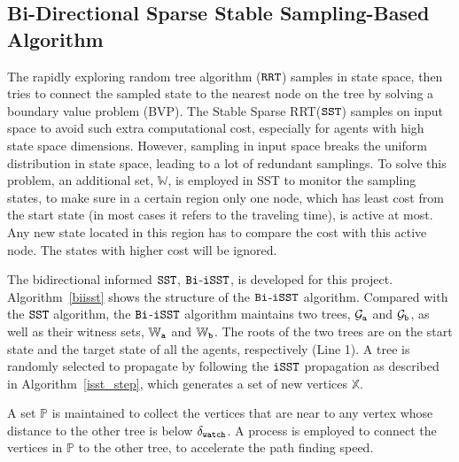\documentclass[conference, onecolumn]{IEEEtran}
\begin{document}
\subsection{Bi-Directional Sparse Stable Sampling-Based Algorithm}
The rapidly exploring random tree algorithm ($\tt RRT$)\cite{lavalle1998rapidly} samples in state space, then tries to connect the sampled state to the nearest node on the tree by solving a boundary value problem (BVP). The Stable Sparse RRT($\tt SST$)\cite{sst} samples on input space to avoid such extra computational cost, especially for agents with high state space dimensions. However, sampling in input space breaks the uniform distribution in state space, leading to a lot of redundant samplings. To solve this problem, an additional set, $\mathbb{W}$, is employed in SST to monitor the sampling states, to make sure in a certain region only one node, which has least cost from the start state (in most cases it refers to the traveling time), is active at most. Any new state located in this region has to compare the cost with this active node. The states with higher cost will be ignored. 

The bidirectional informed $\tt SST$, ${{\tt Bi}}$-${{\tt iSST}}$, is developed for this project. Algorithm~\ref{biisst} shows the structure of the ${{\tt Bi}}$-${{\tt iSST}}$ algorithm. Compared with the ${{\tt SST}}$ algorithm, the ${{\tt Bi}}$-${{\tt iSST}}$ algorithm maintains two trees, $\mathcal{G}_{\tt a} $ and $ \mathcal{G}_{\tt b} $, as well as their witness sets, $\mathbb{W}_{\tt a} $ and $ \mathbb{W}_{\tt b} $. The roots of the two trees are on the start state and the target state of all the agents, respectively (Line 1). A tree is randomly selected to propagate by following the $\tt iSST$ propagation as described in Algorithm~\ref{isst_step}, which generates a set of new vertices $\mathbb{X}$.

A set $\mathbb{P}$ is maintained to collect the vertices that are near to any vertex whose distance to the other tree is below $\delta_{\tt watch}$. A process is employed to connect the vertices in $\mathbb{P}$ to the other tree, to accelerate the path finding speed. 
\end{document}
